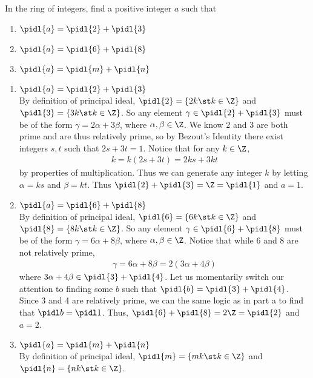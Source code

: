\documentclass{article}
\begin{document}
In the ring of integers, find a positive integer \( a \) such that
\begin{enumerate}[label=\tbo{\alph*.}]
  \item \( \pidl{a} = \pidl{2} + \pidl{3} \)
  \item \( \pidl{a} = \pidl{6} + \pidl{8} \)
  \item \( \pidl{a} = \pidl{m} + \pidl{n} \)
\end{enumerate}

\begin{solution} %
\begin{enumerate}[label=\tbo{\alph*.}]
  \item \( \pidl{a} = \pidl{2} + \pidl{3} \) \\
    By definition of principal ideal, \( \pidl{2}=\{2k\st k\in\Z\} \) and \( \pidl{3}=\{3k\st k\in\Z\} \).
    So any element \(\gamma\in \pidl{2} + \pidl{3} \) must be of the form \( \gamma=2\alpha+3\beta \), where \( \alpha,\beta\in\Z \).
    We know 2 and 3 are both prime and are thus relatively prime, so by Bezout's Identity there exist integers \( s,t \) such that \( 2s+3t=1 \). Notice that for any \( k\in\Z \), \begin{align*}
      k = k(2s+3t) = 2ks+3kt
    \end{align*} by properties of multiplication.
    Thus we can generate any integer \( k \) by letting \( \alpha = ks \) and \( \beta = kt \).
    Thus \( \pidl{2}+\pidl{3} = \Z = \pidl{1} \) and \( a=1 \).
  \item \( \pidl{a} = \pidl{6} + \pidl{8} \) \\
    By definition of principal ideal, \( \pidl{6}=\{6k\st k\in\Z\} \) and \( \pidl{8}=\{8k\st k\in\Z\} \).
    So any element \(\gamma\in\pidl{6} + \pidl{8} \) must be of the form \( \gamma=6\alpha+8\beta \), where \( \alpha,\beta\in\Z \). Notice that while 6 and 8 are not relatively prime, \begin{align*}
      \gamma=6\alpha+8\beta= 2(3\alpha+4\beta)
    \end{align*} where \( 3\alpha+4\beta \in \pidl{3}+\pidl{4} \).
    Let us momentarily switch our attention to finding some \( b \) such that \(\pidl{b} = \pidl{3}+\pidl{4} \).
    Since 3 and 4 are relatively prime, we can the same logic as in part a to find that \( \pidl b = \pidl 1 \).
    Thus, \( \pidl{6}+\pidl{8} = 2\Z = \pidl{2} \) and \( a=2 \).
  \item \( \pidl{a} = \pidl{m} + \pidl{n} \) \\
    By definition of principal ideal, \( \pidl{m}=\{mk\st k\in\Z\} \) and \( \pidl{n}=\{nk\st k\in\Z\} \).

\end{enumerate}
\end{solution}
\end{document}
